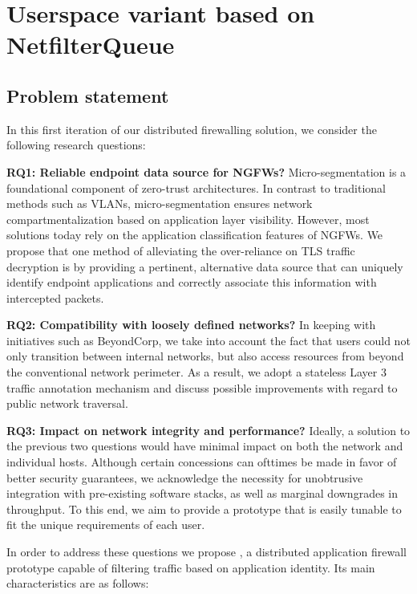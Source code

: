 \section{Userspace variant based on NetfilterQueue}
\label{appfw:daf}

\subsection{Problem statement}
\label{apffw:daf:intro}

In this first iteration of our distributed firewalling solution, we consider the
following research questions:

\textbf{RQ1: Reliable endpoint data source for NGFWs?} Micro-segmentation is a foundational component of zero-trust architectures. In contrast to traditional methods such as VLANs, micro-segmentation ensures network compartmentalization based on application layer visibility. However, most solutions today rely on the application classification features of NGFWs. We propose that one method of alleviating the over-reliance on TLS traffic decryption is by providing a pertinent, alternative data source that can uniquely identify endpoint applications and correctly associate this information with intercepted packets.

\textbf{RQ2: Compatibility with loosely defined networks?} In keeping with initiatives such as BeyondCorp, we take into account the fact that users could not only transition between internal networks, but also access resources from beyond the conventional network perimeter. As a result, we adopt a stateless Layer 3 traffic annotation mechanism and discuss possible improvements with regard to public network traversal.

\textbf{RQ3: Impact on network integrity and performance?} Ideally, a solution to the previous two questions would have minimal impact on both the network and individual hosts. Although certain concessions can ofttimes be made in favor of better security guarantees, we acknowledge the necessity for unobtrusive integration with pre-existing software stacks, as well as marginal downgrades in throughput. To this end, we aim to provide a prototype that is easily tunable to fit the unique requirements of each user.

In order to address these questions we propose \daf{}, a distributed application firewall \cite{ioannidis2000implementing} prototype capable of filtering traffic based on application identity. Its main characteristics are as follows:

